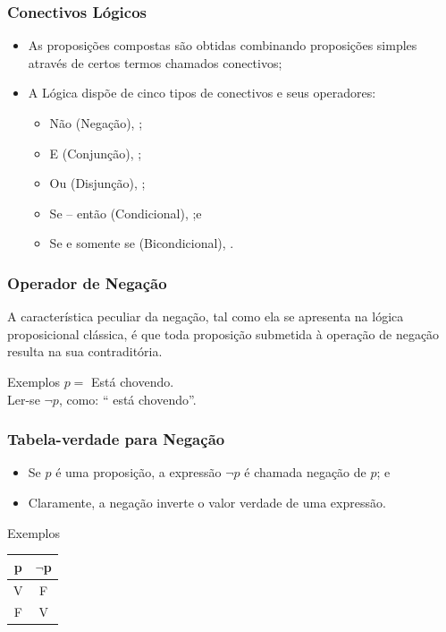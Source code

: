 \documentclass{beamer}
\begin{document}
\begin{frame}
\frametitle{Conectivos Lógicos}

\begin{itemize}
	\item As proposições compostas são obtidas combinando proposições simples através de certos termos chamados conectivos;
	\item A Lógica dispõe de cinco tipos de conectivos e seus operadores:
	\begin{itemize}
		\item Não (Negação), \structure{$\neg$};
		\item E (Conjunção), \structure{$\wedge$};
		\item Ou (Disjunção), \structure{$\vee$};
		\item Se -- então (Condicional), \structure{$\rightarrow$};e
		\item Se e somente se (Bicondicional), \structure{$\leftrightarrow$}.
	\end{itemize}
\end{itemize}
\end{frame}

\begin{frame}
\frametitle{Operador de Negação}

A característica peculiar da negação, tal como ela se apresenta na lógica proposicional clássica, é que toda proposição submetida à operação de negação resulta na sua contraditória. \vfill

\begin{exampleblock}{Exemplos}
$p =$ Está chovendo.\\
Ler-se $\neg p$, como: `` está chovendo''.
\end{exampleblock}
\end{frame}

\begin{frame}
\frametitle{Tabela-verdade para Negação}

\begin{itemize}
	\item Se $p$ é uma proposição, a expressão $\neg p$ é chamada negação de $p$; e
	\item Claramente, a negação inverte o valor verdade de uma expressão.
\end{itemize} \vfill

\begin{exampleblock}{Exemplos}
\center
\begin{tabular}{|c|c|}
\hline
\textbf{p} & \textbf{$\neg$p}\\ \hline
V & F \\ \hline
F & V \\ \hline
\end{tabular}
\end{exampleblock}
\end{frame}
\end{document}
